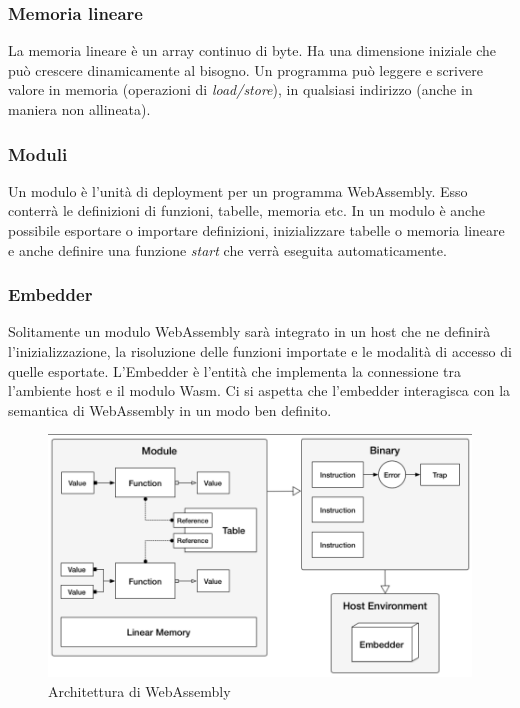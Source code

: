 \subsubsection{Memoria lineare}
La memoria lineare è un  array continuo di byte. Ha una dimensione iniziale che può crescere dinamicamente al bisogno. Un programma può leggere e scrivere valore in memoria (operazioni di \emph{load/store}), in qualsiasi indirizzo (anche in maniera non allineata).
\subsubsection{Moduli}
Un modulo è l'unità di deployment per un programma WebAssembly. Esso conterrà le definizioni di funzioni, tabelle, memoria etc. In un modulo è anche possibile esportare o importare definizioni, inizializzare tabelle o memoria lineare e anche definire una funzione \emph{start} che verrà eseguita automaticamente. 
\subsubsection{Embedder}
Solitamente un modulo WebAssembly sarà integrato in un host che ne definirà l'inizializzazione, la risoluzione delle funzioni importate  e le modalità di accesso di quelle esportate. L'Embedder è l'entità che implementa la connessione tra l'ambiente host e il modulo Wasm. Ci si aspetta che l'embedder interagisca con la semantica di WebAssembly in un modo ben definito.
\begin{figure}
        \begin{center}
                \includegraphics[width=0.9\columnwidth]{images/wasmArchitecture.png}
        \end{center}
        \caption{Architettura di WebAssembly}
        \label{fig:wasmArch}
\end{figure}

